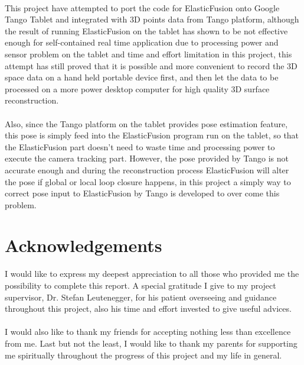 \documentclass[12pt,twoside]{article}
\begin{document}
\\
This project have attempted to port the code for ElasticFusion onto Google Tango Tablet and integrated with 3D points data from Tango platform, although the result of running ElasticFusion on the tablet has shown to be not effective enough for self-contained real time application due to processing power and sensor problem on the tablet and time and effort limitation in this project, this attempt has still proved that it is possible and more convenient to record the 3D space data on a hand held portable device first, and then let the data to be processed on a more power desktop computer for high quality 3D surface reconstruction.\\
\\
Also, since the Tango platform on the tablet provides pose estimation feature, this pose is simply feed into the ElasticFusion program run on the tablet, so that the ElasticFusion part doesn't need to waste time and processing power to execute the camera tracking part. However, the pose provided by Tango is not accurate enough and during the reconstruction process ElasticFusion will alter the pose if global or local loop closure happens, in this project a simply way to correct pose input to ElasticFusion by Tango is developed to  over come this problem. 


\newpage

\section{Acknowledgements}
I would like to express my deepest appreciation to all those who provided me the possibility to complete this report. A special gratitude I give to my project supervisor, Dr. Stefan Leutenegger, for his patient overseeing and guidance throughout this project, also his time and effort invested to give useful advices.\\
\\
I would also like to thank my friends for accepting nothing less than excellence from me. Last but not the least, I would like to thank my parents for supporting me spiritually throughout the progress of this project and my life in general.

\newpage


\tableofcontents

\end{document}
